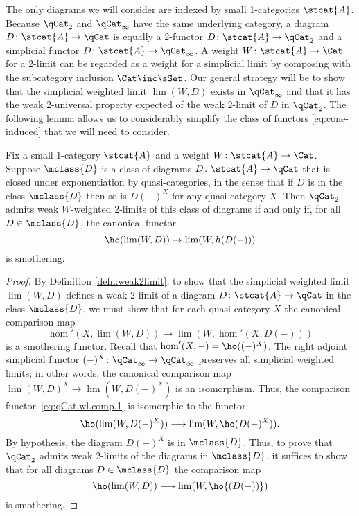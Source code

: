 The only diagrams we will consider are indexed by small 1-categories $\stcat{A}$.   Because $\qCat_2$ and $\qCat_\infty$ have the same underlying category, a diagram $D \colon \stcat{A}\to\qCat$ is equally a 2-functor $D\colon\stcat{A}\to\qCat_2$ and a simplicial functor $D\colon\stcat{A}\to\qCat_\infty$. A weight $W\colon\stcat{A}\to\Cat$ for a 2-limit can be regarded as a weight for a simplicial limit by composing with the subcategory inclusion $\Cat\inc\sSet$. Our general strategy will be to show that  the simplicial weighted limit $\lim(W,D)$ exists in $\qCat_\infty$ and that it has the weak 2-universal property expected of the weak 2-limit of $D$ in $\qCat_2$. The following lemma allows us to considerably simplify the class of functors \eqref{eq:cone-induced} that we will need to consider.

\begin{lem}\label{lem:weak-simplification} Fix a small 1-category $\stcat{A}$ and a weight $W \colon \stcat{A} \to \Cat$. Suppose $\mclass{D}$ is a class of diagrams $D\colon\stcat{A} \to \qCat$ that is closed under exponentiation by quasi-categories, in the sense that if $D$ is in the class $\mclass{D}$ then so is $D(-)^X$ for any quasi-category $X$. Then $\qCat_2$ admits weak $W$-weighted 2-limits of this class of diagrams if and only if, for all $D \in \mclass{D}$, the canonical functor
\[ \ho(\lim(W,D)) \to \lim(W,h(D(-)))\] is smothering.
\end{lem}
\begin{proof}
By Definition \ref{defn:weak2limit}, to show that the simplicial weighted limit $\lim(W,D)$ defines a weak 2-limit of a diagram $D \colon \stcat{A} \to \qCat$ in the class $\mclass{D}$, we must show that  for each quasi-category $X$ the canonical comparison map
  \begin{equation}\label{eq:qCat.wl.comp.1}
    \hom'(X,\lim(W,D)) \longrightarrow \lim(W,\hom'(X,D(-)))
  \end{equation}
  is a smothering functor. Recall that $\hom'(X,-) = \ho((-)^X)$. The right adjoint simplicial functor $(-)^X\colon\qCat_\infty\to\qCat_\infty$ preserves all simplicial weighted limits; in other words, the canonical comparison map $\lim(W,D)^X\to\lim(W,D(-)^X)$ is an isomorphism. Thus, the comparison functor~\eqref{eq:qCat.wl.comp.1} is isomorphic to the functor:
  \begin{equation*}
    \ho(\lim(W,D(-)^X)) \longrightarrow \lim(W,\ho(D(-)^X)).
  \end{equation*}
By hypothesis, the diagram $D(-)^X$ is in $\mclass{D}$. Thus, to prove that $\qCat_2$ admits weak 2-limits of the diagrams in $\mclass{D}$, it suffices to show that for all diagrams $D\in\mclass{D}$ the comparison map
  \begin{equation*}
    \ho(\lim(W,D)) \longrightarrow \lim(W,\ho{(D(-))})
  \end{equation*}
  is smothering. 
\end{proof}


